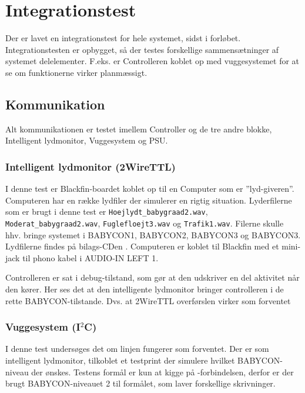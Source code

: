 \chapter{Integrationstest}

Der er lavet en integrationstest for hele systemet, sidst i forløbet. Integrationstesten er opbygget, så der testes forskellige sammensætninger af systemet delelementer. F.eks. er Controlleren koblet op med vuggesystemet for at se om funktionerne virker planmæssigt.

\section{Kommunikation}

Alt kommunikationen er testet imellem Controller og de tre andre blokke, Intelligent lydmonitor, Vuggesystem og PSU.

\subsection*{Intelligent lydmonitor (2WireTTL)}

I denne test er Blackfin-boardet koblet op til en Computer som er ''lyd-giveren''. Computeren har en række lydfiler der simulerer en rigtig situation. Lyderfilerne som er brugt i denne test er \verb+Hoejlydt_babygraad2.wav+, \verb+Moderat_babygraad2.wav+, \verb+Fuglefloejt3.wav+ og \verb+Trafik1.wav+. Filerne skulle hhv. bringe systemet i BABYCON1, BABYCON2, BABYCON3 og BABYCON3. Lydfilerne findes på bilags-CDen \citep{cd}. Computeren er koblet til Blackfin med et mini-jack til phono kabel i AUDIO-IN LEFT 1. 


Controlleren er sat i debug-tilstand, som gør at den udskriver en del aktivitet når den kører. Her ses det at den intelligente lydmonitor bringer controlleren i de rette BABYCON-tilstande. Dvs. at 2WireTTL overførslen virker som forventet

\subsection*{Vuggesystem (I$^2$C)}

I denne test undersøges det om \iic linjen fungerer som forventet. Der er som intelligent lydmonitor, tilkoblet et testprint der simulere hvilket BABYCON-niveau der ønskes. Testens formål er kun at kigge på \iic-forbindelsen, derfor er der brugt BABYCON-niveauet 2 til formålet, som laver forskellige skrivninger.

